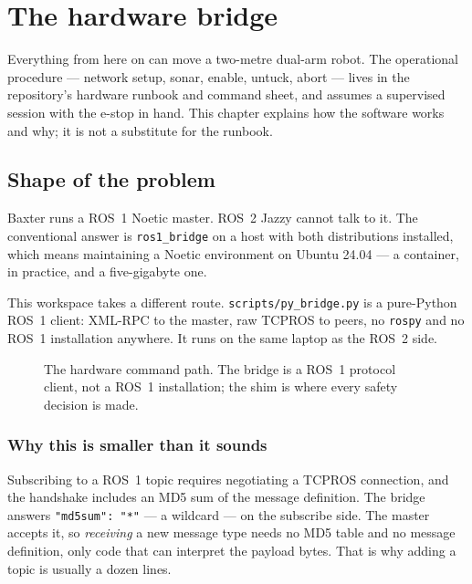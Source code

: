 \chapter{The hardware bridge}
\label{ch:bridge}

\begin{safetybox}
Everything from here on can move a two-metre dual-arm robot. The operational
procedure --- network setup, sonar, enable, untuck, abort --- lives in the
repository's hardware runbook and command sheet, and assumes a supervised session
with the e-stop in hand. This chapter explains how the software works and why;
it is not a substitute for the runbook.
\end{safetybox}

\section{Shape of the problem}

Baxter runs a ROS~1 Noetic master. ROS~2 Jazzy cannot talk to it. The conventional
answer is \texttt{ros1\_bridge} on a host with both distributions installed, which
means maintaining a Noetic environment on Ubuntu 24.04 --- a container, in
practice, and a five-gigabyte one.

This workspace takes a different route. \texttt{scripts/py\_bridge.py} is a
pure-Python ROS~1 client: XML-RPC to the master, raw TCPROS to peers, no
\texttt{rospy} and no ROS~1 installation anywhere. It runs on the same laptop as
the ROS~2 side.

\begin{figure}[h]
\centering
\resizebox{\linewidth}{!}{}
\caption{The hardware command path. The bridge is a ROS~1 protocol client, not a
ROS~1 installation; the shim is where every safety decision is made.}
\label{fig:arch}
\end{figure}

\subsection{Why this is smaller than it sounds}

Subscribing to a ROS~1 topic requires negotiating a TCPROS connection, and the
handshake includes an MD5 sum of the message definition. The bridge answers
\texttt{"md5sum": "*"} --- a wildcard --- on the subscribe side. The master accepts
it, so \emph{receiving} a new message type needs no MD5 table and no message
definition, only code that can interpret the payload bytes. That is why adding a
topic is usually a dozen lines.

